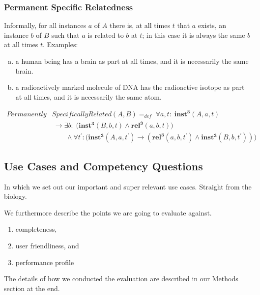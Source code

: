 \documentclass[10pt]{bmc_article}
\newcommand{\mirel}[1]{\ensuremath{\mathrm{\mathbf{#1}}}}
\newcommand{\mclass}[1]{\ensuremath{\mathit{#1}}}
\newcommand{\mrel}[2]{\mirel{#1^#2}}
\newcommand{\mrelt}[1]{\mrel{#1}{3}}
\newenvironment{bmcformat}{\baselineskip20pt\sloppy\setboolean{publ}{false}}{\baselineskip20pt\sloppy}
\begin{document}
\begin{bmcformat}
\subsubsection{Permanent Specific Relatedness}

Informally, for all instances $a$ of \mclass{A} there is, at all times $t$ that $a$ exists, an
instance $b$ of \mclass{B} such that $a$ is related to $b$ at $t$; in this case it is always the
same $b$ at all times $t$. Examples:
\begin{enumerate}[(a)]
\item a human being has a brain as part at all times, and it is necessarily the same brain.
\item a radioactively marked molecule of DNA has the radioactive isotope as part
at all times, and it is necessarily the same atom.
\end{enumerate} 

\begin{equation}
\begin{split}
\mclass{Permanently}&\mclass{SpecificallyRelated}(\mclass{A},\mclass{B}) =_{def}\;
\forall a, t:\; \mrelt{inst}(\mclass{A}, a, t) \\
&\ \rightarrow 
\exists b:\;\big(\mrelt{inst}(\mclass{B},b,t) \wedge 
\mrelt{rel}(a,b,t))
\\
&\quad\quad \wedge \forall t^\prime: (\mrelt{inst}(\mclass{A},a,t^\prime)
\rightarrow (\mrelt{rel}(a,b,t^\prime) \wedge
\mrelt{inst}(\mclass{B},b,t^\prime))\big)
\end{split}
\label{eq:specifically}
\end{equation}


\subsection*{Use Cases and Competency Questions}

In which we set out our important and super relevant use cases. Straight from the biology. 


We furthermore describe the points we are going to evaluate against. 
\begin{enumerate}
	\item completeness, 
	\item user friendliness, and 
	\item performance profile
\end{enumerate}
The details of how we conducted the evaluation are described in our Methods section at the end. 





\end{bmcformat}
\end{document}
